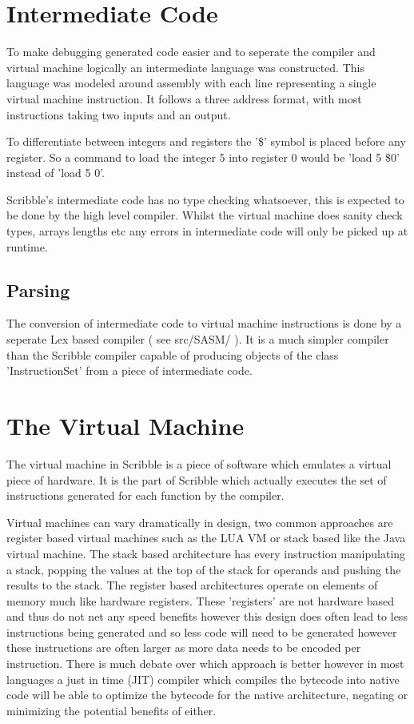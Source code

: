 \documentclass[]{final_report}
\begin{document}
\chapter{Intermediate Code}

To make debugging generated code easier and to seperate the compiler and virtual machine logically an intermediate language was constructed. This language was modeled around assembly with each line representing a single virtual machine instruction. It follows a three address format, with most instructions taking two inputs and an output.

To differentiate between integers and registers the '\$' symbol is placed before any register. So a command to load the integer 5 into register 0 would be 'load 5 \$0' instead of 'load 5 0'.

Scribble's intermediate code has no type checking whatsoever, this is expected to be done by the high level compiler. Whilst the virtual machine does sanity check types, arrays lengths etc any errors in intermediate code will only be picked up at runtime.

\section{Parsing}

The conversion of intermediate code to virtual machine instructions is done by a seperate Lex based compiler ( see src/SASM/ ). It is a much simpler compiler than the Scribble compiler capable of producing objects of the class 'InstructionSet' from a piece of intermediate code.

\chapter{The Virtual Machine}

The virtual machine in Scribble is a piece of software which emulates a virtual piece of hardware. It is the part of Scribble which actually executes the set of instructions generated for each function by the compiler. 

Virtual machines can vary dramatically in design, two common approaches are register based virtual machines such as the LUA VM or stack based like the Java virtual machine. The stack based architecture has every instruction manipulating a stack, popping the values at the top of the stack for operands and pushing the results to the stack. The register based architectures operate on elements of memory much like hardware registers. These 'registers' are not hardware based and thus do not net any speed benefits however this design does often lead to less instructions being generated and so less code will need to be generated however these instructions are often larger as more data needs to be encoded per instruction. There is much debate over which approach is better however in most languages a just in time (JIT) compiler which compiles the bytecode into native code will be able to optimize the bytecode for the native architecture, negating or minimizing the potential benefits of either.
\end{document}
